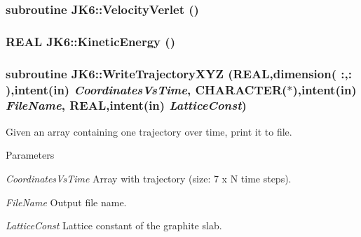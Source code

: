 \label{_main_8f90_ae10c016023dc8faa80bff5390d4723be}
\hypertarget{_main_8f90_acbd07b94fa51be5f41afe3c399158cd2}{
\subsubsection[{VelocityVerlet}]{\setlength{\rightskip}{0pt plus 5cm}subroutine JK6::VelocityVerlet ()}}
\label{_main_8f90_acbd07b94fa51be5f41afe3c399158cd2}
\hypertarget{_main_8f90_a407e632afbbd3f7708e2fd6ee89648cc}{
\subsubsection[{KineticEnergy}]{\setlength{\rightskip}{0pt plus 5cm}REAL JK6::KineticEnergy ()}}
\label{_main_8f90_a407e632afbbd3f7708e2fd6ee89648cc}
\hypertarget{_main_8f90_ad150b813c0174181d843297d3c2ae940}{
\subsubsection[{WriteTrajectoryXYZ}]{\setlength{\rightskip}{0pt plus 5cm}subroutine JK6::WriteTrajectoryXYZ (REAL,dimension( :,: ),intent(in) {\em CoordinatesVsTime}, \/  CHARACTER($\ast$),intent(in) {\em FileName}, \/  REAL,intent(in) {\em LatticeConst})}}
\label{_main_8f90_ad150b813c0174181d843297d3c2ae940}


Given an array containing one trajectory over time, print it to file. 
\begin{DoxyParams}{Parameters}
\item[{\em CoordinatesVsTime}]Array with trajectory (size: 7 x N time steps). \item[{\em FileName}]Output file name. \item[{\em LatticeConst}]Lattice constant of the graphite slab. \end{DoxyParams}
